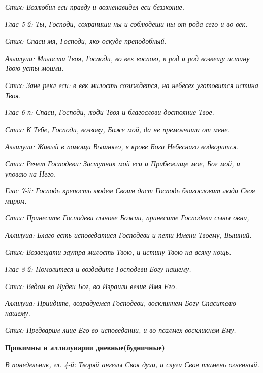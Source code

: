 \itshape Стих:\normalfont{} Возлюбил еси правду и возненавидел еси беззконие.


\itshape Глас 5-й:\normalfont{} Ты, Господи, сохраниши ны и соблюдеши ны от рода сего и во век.


\itshape Стих:\normalfont{} Спаси мя, Господи, яко оскуде преподобный.


\itshape Аллилуиа:\normalfont{} Милости Твоя, Господи, во век воспою, в род и род возвещу истину Твою усты моими.


\itshape Стих:\normalfont{} Зане рекл еси: в век милость созиждется, на небесех уготовится истина Твоя.


\itshape Глас 6-п:\normalfont{} Спаси, Господи, люди Твоя и благослови достояние Твое.


\itshape Стих:\normalfont{} К Тебе, Господи, воззову, Боже мой, да не премолчиши от мене.


\itshape Аллилуиа:\normalfont{} Живый в помощи Вышняго, в крове Бога Небеснаго водворится.


\itshape Стих:\normalfont{} Речет Господеви: Заступник мой еси и Прибежище мое, Бог мой, и уповаю на Него.


\itshape Глас 7-й:\normalfont{} Господь крепость людем Своим даст Господь благословит люди Своя миром.


\itshape Стих:\normalfont{} Принесите Господеви сынове Божии, принесите Господеви сыны овни,


\itshape Аллилуиа:\normalfont{} Благо есть исповедатися Господеви и пети Имени Твоему, Вышний.


\itshape Стих:\normalfont{} Возвещати заутра милость Твою, и истину Твою на всяку нощь.


\itshape Глас 8-й:\normalfont{} Помолитеся и воздадите Господеви Богу нашему.


\itshape Стих:\normalfont{} Ведом во Иудеи Бог, во Израили велие Имя Его.


\itshape Аллилуиа:\normalfont{} Приидите, возрадуемся Господеви, воскликнем Богу Спасителю нашему.


\itshape Стих:\normalfont{} Предварим лице Его во исповедании, и во псалмех воскликнем Ему.





\bfseries Прокимны и аллилуиарии дневные(будничные)\normalfont{}


\itshape В понедельник, гл. 4-й:\normalfont{} Творяй ангелы Своя духи, и слуги Своя пламень огненный.


